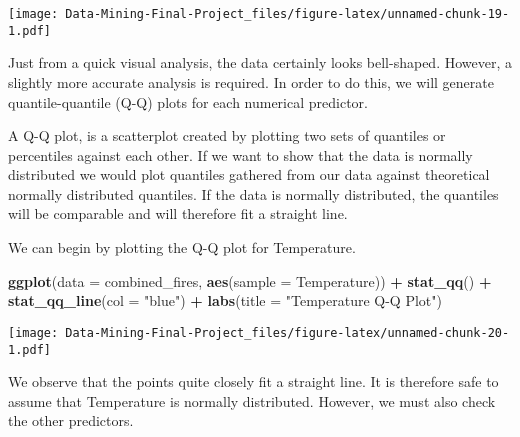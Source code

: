 \documentclass[
]{article}
\newenvironment{Shaded}{\begin{snugshade}}{\end{snugshade}}
\newcommand{\AttributeTok}[1]{\textcolor[rgb]{0.13,0.29,0.53}{#1}}
\newcommand{\FunctionTok}[1]{\textcolor[rgb]{0.13,0.29,0.53}{\textbf{#1}}}
\newcommand{\NormalTok}[1]{#1}
\newcommand{\SpecialCharTok}[1]{\textcolor[rgb]{0.81,0.36,0.00}{\textbf{#1}}}
\newcommand{\StringTok}[1]{\textcolor[rgb]{0.31,0.60,0.02}{#1}}
\begin{document}
\texttt{[image: Data-Mining-Final-Project\_files/figure-latex/unnamed-chunk-19-1.pdf]}

Just from a quick visual analysis, the data certainly looks bell-shaped.
However, a slightly more accurate analysis is required. In order to do
this, we will generate quantile-quantile (Q-Q) plots for each numerical
predictor.

A Q-Q plot, is a scatterplot created by plotting two sets of quantiles
or percentiles against each other. If we want to show that the data is
normally distributed we would plot quantiles gathered from our data
against theoretical normally distributed quantiles. If the data is
normally distributed, the quantiles will be comparable and will
therefore fit a straight line.

We can begin by plotting the Q-Q plot for Temperature.

\begin{Shaded}
\begin{Highlighting}[]
\FunctionTok{ggplot}\NormalTok{(}\AttributeTok{data =}\NormalTok{ combined\_fires, }\FunctionTok{aes}\NormalTok{(}\AttributeTok{sample =}\NormalTok{ Temperature)) }\SpecialCharTok{+}
  \FunctionTok{stat\_qq}\NormalTok{() }\SpecialCharTok{+}
  \FunctionTok{stat\_qq\_line}\NormalTok{(}\AttributeTok{col =} \StringTok{"blue"}\NormalTok{) }\SpecialCharTok{+}
  \FunctionTok{labs}\NormalTok{(}\AttributeTok{title =} \StringTok{"Temperature Q{-}Q Plot"}\NormalTok{)}
\end{Highlighting}
\end{Shaded}

\texttt{[image: Data-Mining-Final-Project\_files/figure-latex/unnamed-chunk-20-1.pdf]}

We observe that the points quite closely fit a straight line. It is
therefore safe to assume that Temperature is normally distributed.
However, we must also check the other predictors.
\end{document}
